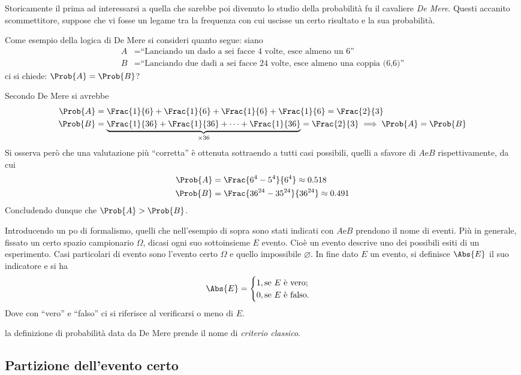\documentclass{subfiles}
\begin{document}
Storicamente il prima ad interessarsi a quella che sarebbe poi divenuto lo studio della probabilità fu il cavaliere \emph{De Mere}.
Questi accanito scommettitore, suppose che vi fosse un legame tra la frequenza con cui uscisse un certo risultato e la sua probabilità.
\begin{Example*}
    Come esempio della logica di De Mere si consideri quanto segue: siano
    $$\begin{aligned}
            A & = \text{``Lanciando un dado a sei facce 4 volte, esce almeno un 6''}               \\
            B & = \text{``Lanciando due dadi a sei facce 24 volte, esce almeno una coppia (6,6)''}
        \end{aligned}$$
    ci si chiede: $\Prob{A} = \Prob{B}$?

    Secondo De Mere si avrebbe
    $$\begin{aligned}
            \Prob{A} & = \Frac{1}{6} + \Frac{1}{6} + \Frac{1}{6} + \Frac{1}{6} = \Frac{2}{3}                                                     \\
            \Prob{B} & = \underbrace{\Frac{1}{36} + \Frac{1}{36} + \cdots + \Frac{1}{36}}_{\times 36} = \Frac{2}{3} \implies \Prob{A} = \Prob{B}
        \end{aligned}$$
    Si osserva però che una valutazione più ``corretta'' è ottenuta sottraendo a tutti casi possibili, quelli a sfavore di $A \text{e} B$ rispettivamente,
    da cui
    $$\begin{aligned}
            \Prob{A} & = \Frac{6^{4} - 5^{4}}{6^{4}} \approx 0.518       \\
            \Prob{B} & = \Frac{36^{24} - 35^{24}}{36^{24}} \approx 0.491
        \end{aligned}$$
    Concludendo dunque che $\Prob{A} > \Prob{B}$.
\end{Example*}

Introducendo un po di formalismo, quelli che nell'esempio di sopra sono stati indicati con $A \text{e} B$ prendono il nome di eventi.
Più in generale, fissato un certo spazio campionario $\Omega$, dicasi ogni suo sottoinsieme $E$ evento.
Cioè un evento descrive uno dei possibili esiti di un esperimento.
Casi particolari di evento sono l'evento certo $\Omega$ e quello impossibile $\varnothing$.
In fine dato $E$ un evento, si definisce $\Abs{E}$ il suo indicatore e si ha
$$\Abs{E} = \begin{cases}
        1, \text{se $E$ è vero;} \\
        0, \text{se $E$ è falso.}
    \end{cases}$$
Dove con ``vero'' e ``falso'' ci si riferisce al verificarsi o meno di $E$.

\begin{MarginNote}
    la definizione di probabilità data da De Mere prende il nome di \emph{criterio classico}.
\end{MarginNote}

\subsection{Partizione dell'evento certo}

\clearpage
\end{document}
